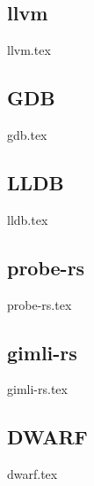 

\subsection{llvm}
{llvm.tex}

\subsection{GDB}
{gdb.tex}

\subsection{LLDB}
{lldb.tex}

\subsection{probe-rs}
{probe-rs.tex}

\subsection{gimli-rs}
{gimli-rs.tex}

\subsection{DWARF}
{dwarf.tex}

